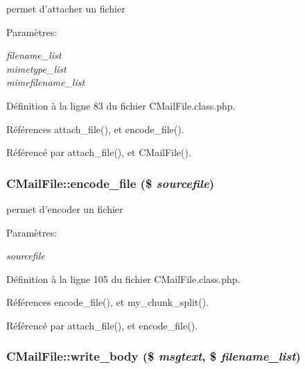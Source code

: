 permet d'attacher un fichier 

\begin{Desc}
\item[Param\`{e}tres:]
\begin{description}
\item[{\em filename\_\-list}]\item[{\em mimetype\_\-list}]\item[{\em mimefilename\_\-list}]\end{description}
\end{Desc}


D\'{e}finition \`{a} la ligne 83 du fichier CMail\-File.class.php.

R\'{e}f\'{e}rences attach\_\-file(), et encode\_\-file().

R\'{e}f\'{e}renc\'{e} par attach\_\-file(), et CMail\-File().\hypertarget{classCMailFile_a2}{
\subsubsection[encode\_\-file]{\setlength{\rightskip}{0pt plus 5cm}CMail\-File::encode\_\-file (\$ {\em sourcefile})}}
\label{classCMailFile_a2}


permet d'encoder un fichier 

\begin{Desc}
\item[Param\`{e}tres:]
\begin{description}
\item[{\em sourcefile}]\end{description}
\end{Desc}


D\'{e}finition \`{a} la ligne 105 du fichier CMail\-File.class.php.

R\'{e}f\'{e}rences encode\_\-file(), et my\_\-chunk\_\-split().

R\'{e}f\'{e}renc\'{e} par attach\_\-file(), et encode\_\-file().\hypertarget{classCMailFile_a4}{
\subsubsection[write\_\-body]{\setlength{\rightskip}{0pt plus 5cm}CMail\-File::write\_\-body (\$ {\em msgtext}, \$ {\em filename\_\-list})}}
\label{classCMailFile_a4}


